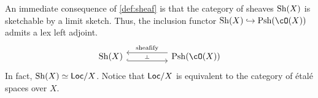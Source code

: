 \documentclass[article,10pt,oneside]{memoir}
\begin{document}
An immediate consequence of \cref{def:sheaf} is that the category of sheaves $\operatorname{Sh}(X)$ is sketchable by a limit sketch.
Thus, the inclusion functor $\Sh(X) \into \Psh(\cO(X))$ admits a lex left adjoint.
\[\begin{tikzcd}
    {\Sh(X)} && {\Psh(\cO(X))}
    \arrow[""{name=0, anchor=center, inner sep=0}, shift right=2, hook, from=1-1, to=1-3]
    \arrow[""{name=1, anchor=center, inner sep=0}, "{\text{sheafify}}"', shift right=2, from=1-3, to=1-1]
    \arrow["\dashv"{anchor=center, rotate=-90}, draw=none, from=1, to=0]
  \end{tikzcd}\]
In fact, $\operatorname{Sh}(X) \simeq \mathsf{Loc}/X$.
Notice that $\mathsf{Loc}/X$ is equivalent to the category of \'etal\'e spaces over $X$.




\end{document}
